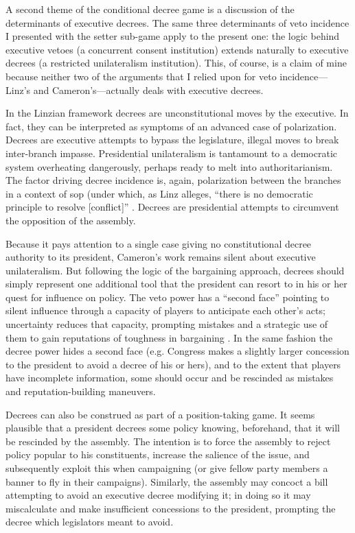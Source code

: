 A second theme of the conditional decree game is a discussion of the determinants of executive decrees.  The same three determinants of veto incidence I presented with the setter sub-game apply to the present one: the logic behind executive vetoes (a concurrent consent institution) extends naturally to executive decrees (a restricted unilateralism institution).  This, of course, is a claim of mine because neither two of the arguments that I relied upon for veto incidence---Linz's and Cameron's---actually deals with executive decrees.  

In the Linzian framework decrees are unconstitutional moves by the executive.  In fact, they can be interpreted as symptoms of an advanced case of polarization.  Decrees are executive attempts to bypass the legislature, illegal moves to break inter-branch impasse.  Presidential unilateralism is tantamount to a democratic system overheating dangerously, perhaps ready to melt into authoritarianism.  The factor driving decree incidence is, again, polarization between the branches in a context of sop (under which, as Linz alleges, ``there is no democratic principle to resolve [conflict]'' \citeyear[][7]{linz.1994}.  Decrees are presidential attempts to circumvent the opposition of the assembly.  

Because it pays attention to a single case giving no constitutional decree authority to its president, Cameron's work remains silent about executive unilateralism.  But following the logic of the bargaining approach, decrees should simply represent one additional tool that the president can resort to in his or her quest for influence on policy.  The veto power has a ``second face'' pointing to silent influence through a capacity of players to anticipate each other's acts; uncertainty reduces that capacity, prompting mistakes and a strategic use of them to gain reputations of toughness in bargaining \citep{cameron.2000,mccarty.1997}.  In the same fashion the decree power hides a second face (e.g. Congress makes a slightly larger concession to the president to avoid a decree of his or hers), and to the extent that players have incomplete information, some should occur and be rescinded as mistakes and reputation-building maneuvers.  

Decrees can also be construed as part of a position-taking game.  It seems plausible that a president decrees some policy knowing, beforehand, that it will be rescinded by the assembly.  The intention is to force the assembly to reject policy popular to his constituents, increase the salience of the issue, and subsequently exploit this when campaigning (or give fellow party members a banner to fly in their campaigns).  Similarly, the assembly may concoct a bill attempting to avoid an executive decree modifying it; in doing so it may miscalculate and make insufficient concessions to the president, prompting the decree which legislators meant to avoid.  

